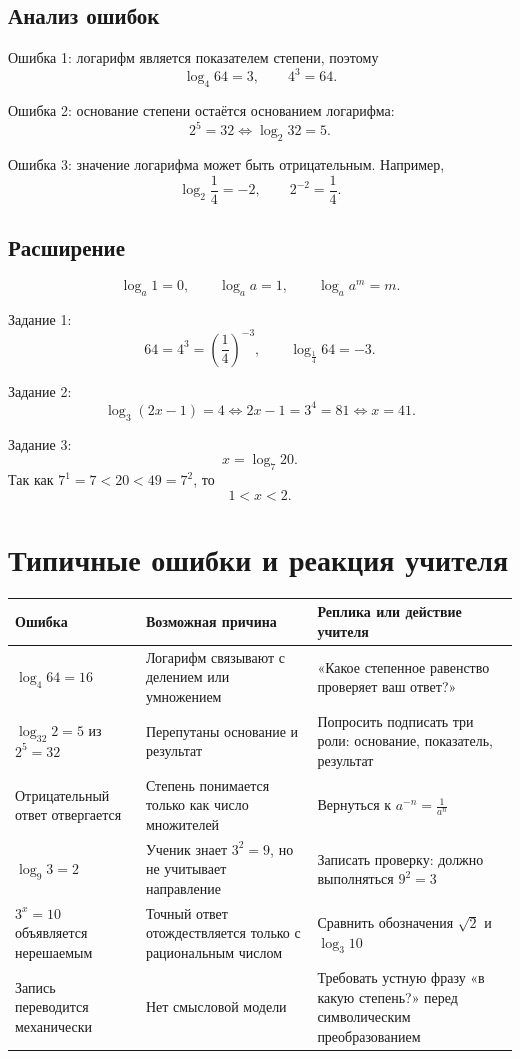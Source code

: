 \subsection{Анализ ошибок}

Ошибка 1: логарифм является показателем степени, поэтому
\[
  \log_4 64=3,\qquad 4^3=64.
\]

Ошибка 2: основание степени остаётся основанием логарифма:
\[
  2^5=32\Longleftrightarrow\log_2 32=5.
\]

Ошибка 3: значение логарифма может быть отрицательным. Например,
\[
  \log_2\frac14=-2,\qquad 2^{-2}=\frac14.
\]

\subsection{Расширение}

\[
  \log_a1=0,
  \qquad
  \log_a a=1,
  \qquad
  \log_a a^m=m.
\]

Задание 1:
\[
  64=4^3=\left(\frac14\right)^{-3},
  \qquad
  \boxed{\log_{\frac14}64=-3}.
\]

Задание 2:
\[
  \log_3(2x-1)=4
  \Longleftrightarrow
  2x-1=3^4=81
  \Longleftrightarrow
  \boxed{x=41}.
\]

Задание 3:
\[
  \boxed{x=\log_7 20}.
\]
Так как \(7^1=7<20<49=7^2\), то
\[
  1<x<2.
\]

\section{Типичные ошибки и реакция учителя}

\begin{center}
  \small
  \renewcommand{\arraystretch}{1.38}
  \begin{tabularx}{\textwidth}{@{}p{}p{}X@{}}
    \toprule
    \rowcolor{TableHeader}
    Ошибка & Возможная причина & Реплика или действие учителя \\
    \midrule
    \(\log_4 64=16\) & Логарифм связывают с делением или умножением &
      «Какое степенное равенство проверяет ваш ответ?» \\
    \(\log_{32}2=5\) из \(2^5=32\) & Перепутаны основание и результат &
      Попросить подписать три роли: основание, показатель, результат \\
    Отрицательный ответ отвергается & Степень понимается только как число
      множителей & Вернуться к \(a^{-n}=\frac1{a^n}\) \\
    \(\log_9 3=2\) & Ученик знает \(3^2=9\), но не учитывает направление &
      Записать проверку: должно выполняться \(9^2=3\) \\
    \(3^x=10\) объявляется нерешаемым & Точный ответ отождествляется только
      с рациональным числом & Сравнить обозначения \(\sqrt2\) и
      \(\log_3 10\) \\
    Запись переводится механически & Нет смысловой модели & Требовать устную
      фразу «в какую степень?» перед символическим преобразованием \\
    \bottomrule
  \end{tabularx}
\end{center}

